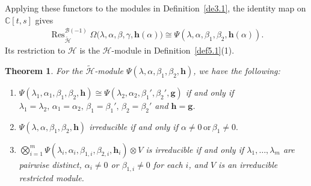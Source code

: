 \documentclass[a4paper]{amsart}
\numberwithin{equation}{section}
\newtheorem{theorem}{Theorem}[section]
\begin{document}
Applying these functors to the modules in Definition~\ref{de3.1}, the
identity map on $\mathbb C[t,s]$ gives
\begin{align*}
\operatorname{Res}^{\mathcal B(-1)}_{\widetilde{\mathcal H}}
\Omega\big(\lambda,\alpha,\beta,\gamma,\mathbf h(\alpha)\big)
\cong
\Psi(\lambda,\alpha,\beta_1,\beta_2,\mathbf h(\alpha)).
\end{align*}
Its restriction to $\mathcal H$ is the $\mathcal H$-module in
Definition~\ref{def5.1}(1).
\begin{theorem}\label{thm5.2}
For the $\widetilde{\mathcal{H}}$-module $\Psi(\lambda,\alpha,\beta_1,\beta_2,\mathbf h)$, we have the following:
\begin{enumerate}
    \item $\Psi(\lambda_{1},\alpha_{1},\beta_{1},\beta_{2},\mathbf{h})\cong\Psi(\lambda_{2},\alpha_{2},\beta_{1}',\beta_{2}',\mathbf{g})$ if and only if
   $ \lambda_{1}=\lambda_{2},\,
    \alpha_{1}=\alpha_{2},\,
    \beta_{1}=\beta_{1}',\,
    \beta_{2}=\beta_{2}'$ and $
    \mathbf{h}=\mathbf{g}$.
    \item $\Psi(\lambda,\alpha,\beta_{1},\beta_{2},\mathbf{h})$ irreducible if and only if
    $
    \alpha\neq 0 \, \text{or} \, \beta_{1}\neq 0.
    $
    \item $\bigotimes_{i=1}^{m}\Psi(\lambda_{i},\alpha_{i},\beta_{1,i},\beta_{2,i},\mathbf{h}_{i})\otimes V$
    is irreducible if and only if $\lambda_{1},\ldots,\lambda_{m}$ are pairwise distinct,
    $\alpha_{i}\neq 0$ or $\beta_{1,i}\neq 0$ for each $i$, and $V$ is an irreducible
    restricted module.
\end{enumerate}
\end{theorem}
\end{document}
